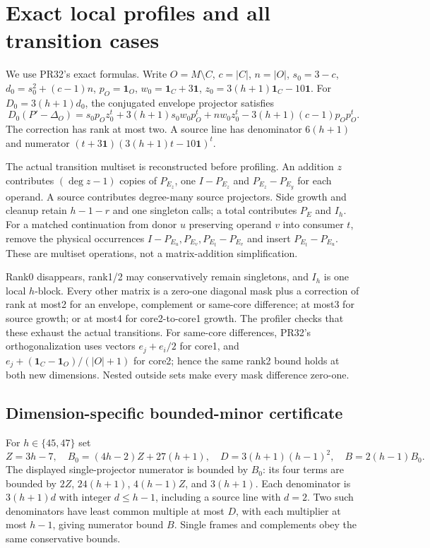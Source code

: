 \documentclass[11pt]{article}
\begin{document}
\section{Exact local profiles and all transition cases}
We use PR32's exact formulas. Write $O=M\setminus C$, $c=|C|$, $n=|O|$,
$s_0=3-c$, $d_0=s_0^2+(c-1)n$, $p_O=\mathbf1_O$,
$w_0=\mathbf1_C+3\mathbf1$, $z_0=3(h+1)\mathbf1_C-10\mathbf1$.
For $D_0=3(h+1)d_0$, the conjugated envelope projector satisfies
\[
 D_0(P'-\Delta_O)=s_0p_Oz_0^t+3(h+1)s_0w_0p_O^t
             +nw_0z_0^t-3(h+1)(c-1)p_Op_O^t.
\]
The correction has rank at most two. A source line has denominator
$6(h+1)$ and numerator $(t+3\mathbf1)(3(h+1)t-10\mathbf1)^t$.

The actual transition multiset is reconstructed before profiling. An addition
$z$ contributes $(\deg z-1)$ copies of $P_{E_z}$, one $I-P_{E_z}$ and
$P_{E_z}-P_{E_y}$ for each operand. A source contributes degree-many source
projectors. Side growth and cleanup retain $h-1-r$ and one singleton calls;
a total contributes $P_E$ and $I_h$. For a matched continuation from donor
$u$ preserving operand $v$ into consumer $t$, remove the physical occurrences
$I-P_{E_u},P_{E_v},P_{E_t}-P_{E_v}$ and insert $P_{E_t}-P_{E_u}$.
These are multiset operations, not a matrix-addition simplification.

Rank0 disappears, rank1/2 may conservatively remain singletons, and $I_h$
is one local $h$-block. Every other matrix is a zero-one diagonal mask plus
a correction of rank at most2 for an envelope, complement or same-core
difference; at most3 for source growth; or at most4 for core2-to-core1 growth.
The profiler checks that these exhaust the actual transitions. For same-core
differences, PR32's orthogonalization uses vectors $e_j+e_i/2$ for core1,
and $e_j+(\mathbf1_C-\mathbf1_O)/(|O|+1)$ for core2; hence the same rank2
bound holds at both new dimensions. Nested outside sets make every mask
difference zero-one.

\subsection{Dimension-specific bounded-minor certificate}
For $h\in\{45,47\}$ set
\[
 Z=3h-7,\quad B_0=(4h-2)Z+27(h+1),\quad
 D=3(h+1)(h-1)^2,\quad B=2(h-1)B_0.
\]
The displayed single-projector numerator is bounded by $B_0$: its four
terms are bounded by $2Z$, $24(h+1)$, $4(h-1)Z$, and $3(h+1)$.
Each denominator is $3(h+1)d$ with integer $d\le h-1$, including a source
line with $d=2$. Two such denominators have least common multiple at most
$D$, with each multiplier at most $h-1$, giving numerator bound $B$.
Single frames and complements obey the same conservative bounds.
\end{document}
